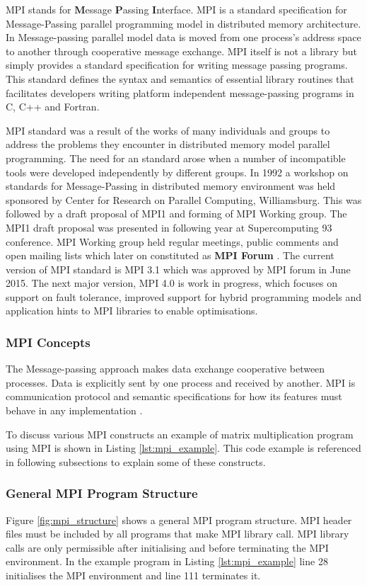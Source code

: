 \label{mpi}
MPI stands for \textbf{M}essage \textbf{P}assing \textbf{I}nterface. MPI is a standard specification for Message-Passing parallel programming model in distributed memory architecture. In Message-passing parallel model data is moved from one process's address space to another through cooperative message exchange. MPI itself is not a library but simply provides a standard specification for writing message passing programs. This standard defines the syntax and semantics of essential library routines that facilitates developers writing platform independent message-passing programs in C, C++ and Fortran. \citep{Barney:16-mpi}

MPI standard was a result of the works of many individuals and groups to address the problems they encounter in distributed memory model parallel programming. The need for an standard arose when a number of incompatible tools were developed independently by different groups. In 1992 a workshop on standards for Message-Passing in distributed memory environment was held sponsored by Center for Research on Parallel Computing, Williamsburg. This was followed by a draft proposal of MPI1 and forming of MPI Working group. The MPI1 draft proposal was presented in following year at Supercomputing 93 conference. MPI Working group held regular meetings, public comments and open mailing lists which later on constituted as \textbf{MPI Forum} \citep{Barney:16-mpi}. The current version of MPI standard is MPI 3.1 which was approved by MPI forum in June 2015. The next major version, MPI 4.0 is work in progress, which focuses on support on fault tolerance, improved support for hybrid programming models and application hints to MPI libraries to enable optimisations\citep{mpi-forum:16}.

\subsubsection{MPI Concepts}
The Message-passing approach makes data exchange cooperative between processes. Data is explicitly sent by one process and received by another. MPI is communication protocol and semantic specifications for how its features must behave in any implementation \citep{Gropp:99}.

To discuss various MPI constructs an example of matrix multiplication program using MPI is shown in Listing \ref{lst:mpi_example}. This code example is referenced in following subsections to explain some of these constructs.

\subsubsection{General MPI Program Structure}
Figure \ref{fig:mpi_structure} shows a general MPI program structure. MPI header files must be included by all programs that make MPI library call. MPI library calls are only permissible after initialising and before terminating the MPI environment\citep{Barney:16-mpi}. In the example program in Listing \ref{lst:mpi_example} line 28 initialises the MPI environment and line 111 terminates it.

